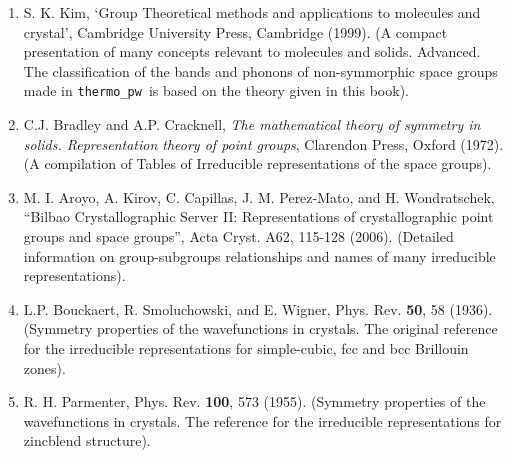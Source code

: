 \documentclass[12pt,a4paper,twoside]{report}
\def\tpw{\texttt{thermo\_pw}}
\begin{document}
\begin{enumerate}
\item
S. K. Kim, `Group Theoretical methods and applications to molecules and 
crystal',
Cambridge University Press, Cambridge (1999). 
(A compact presentation of many concepts relevant to molecules and solids.
Advanced. The classification of the bands and phonons of non-symmorphic space groups
made in \tpw\ is based on the theory given in this book).

\item
C.J. Bradley and A.P. Cracknell, {\it The mathematical
theory of symmetry in solids. Representation theory of point groups},
Clarendon Press, Oxford (1972). (A compilation of Tables of Irreducible 
representations of the space groups).

\item
M. I. Aroyo, A. Kirov, C. Capillas, J. M. Perez-Mato, and H. Wondratschek,
``Bilbao Crystallographic Server II: Representations of crystallographic 
point groups and space groups'', Acta Cryst. A62, 115-128 (2006).
(Detailed information on group-subgroups relationships and names
of many irreducible representations).

\item
L.P. Bouckaert, R. Smoluchowski, and E. Wigner, Phys. Rev. {\bf 50}, 58 (1936).
(Symmetry properties of the wavefunctions in crystals. The original reference
for the irreducible representations for simple-cubic, fcc and bcc
Brillouin zones).

\item
R. H. Parmenter, Phys. Rev. {\bf 100}, 573 (1955).
(Symmetry properties of the wavefunctions in crystals. The reference
for the irreducible representations for zincblend structure).

\end{enumerate}
\end{document}
